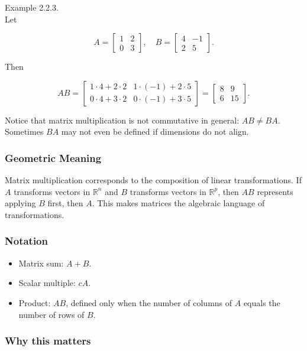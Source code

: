 \documentclass[
  12pt,
  a4paper,
]{article}
\begin{document}
Example 2.2.3.\\
Let

\[A = \begin{bmatrix}
1 & 2 \\
0 & 3
\end{bmatrix}, \quad
B = \begin{bmatrix}
4 & -1 \\
2 & 5
\end{bmatrix}.\]

Then

\[AB = \begin{bmatrix}
1\cdot4 + 2\cdot2 & 1\cdot(-1) + 2\cdot5 \\
0\cdot4 + 3\cdot2 & 0\cdot(-1) + 3\cdot5
\end{bmatrix}
=
\begin{bmatrix}
8 & 9 \\
6 & 15
\end{bmatrix}.\]

Notice that matrix multiplication is not commutative in general:
\(AB \neq BA\). Sometimes \(BA\) may not even be defined if dimensions
do not align.

\subsubsection{Geometric Meaning}\label{geometric-meaning}

Matrix multiplication corresponds to the composition of linear
transformations. If \(A\) transforms vectors in \(\mathbb{R}^n\) and
\(B\) transforms vectors in \(\mathbb{R}^p\), then \(AB\) represents
applying \(B\) first, then \(A\). This makes matrices the algebraic
language of transformations.

\subsubsection{Notation}\label{notation-5}

\begin{itemize}
\item
  Matrix sum: \(A+B\).
\item
  Scalar multiple: \(cA\).
\item
  Product: \(AB\), defined only when the number of columns of \(A\)
  equals the number of rows of \(B\).
\end{itemize}

\subsubsection{Why this matters}\label{why-this-matters-5}
\end{document}
